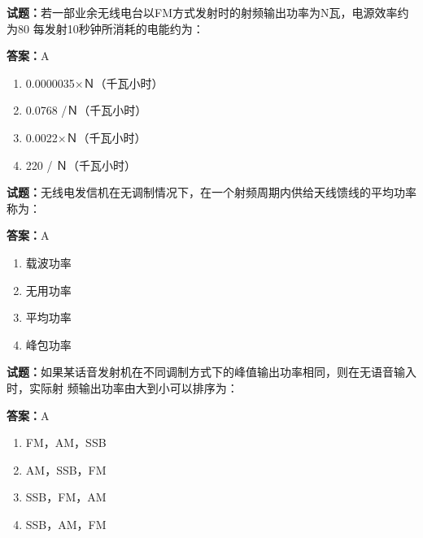 \documentclass{ctexbook}
\begin{document}




\vspace{1em}

\textbf{试题：}若一部业余无线电台以FM方式发射时的射频输出功率为N瓦，电源效率约为80%
每发射10秒钟所消耗的电能约为： 

\textbf{答案：}A 

\begin{enumerate}[leftmargin=3em]
  \item 0.0000035×Ｎ（千瓦小时） 

  \item 0.0768 /Ｎ（千瓦小时） 

  \item 0.0022×Ｎ（千瓦小时） 

  \item 220 / Ｎ（千瓦小时） 


\end{enumerate}





\vspace{1em}

\textbf{试题：}无线电发信机在无调制情况下，在一个射频周期内供给天线馈线的平均功率称为： 

\textbf{答案：}A 

\begin{enumerate}[leftmargin=3em]
  \item 载波功率 

  \item 无用功率 

  \item 平均功率 

  \item 峰包功率 

\end{enumerate}





\vspace{1em}

\textbf{试题：}如果某话音发射机在不同调制方式下的峰值输出功率相同，则在无语音输入时，实际射
频输出功率由大到小可以排序为： 

\textbf{答案：}A 

\begin{enumerate}[leftmargin=3em]
  \item FM，AM，SSB 

  \item AM，SSB，FM 

  \item SSB，FM，AM 

  \item SSB，AM，FM 

\end{enumerate}
\end{document}
